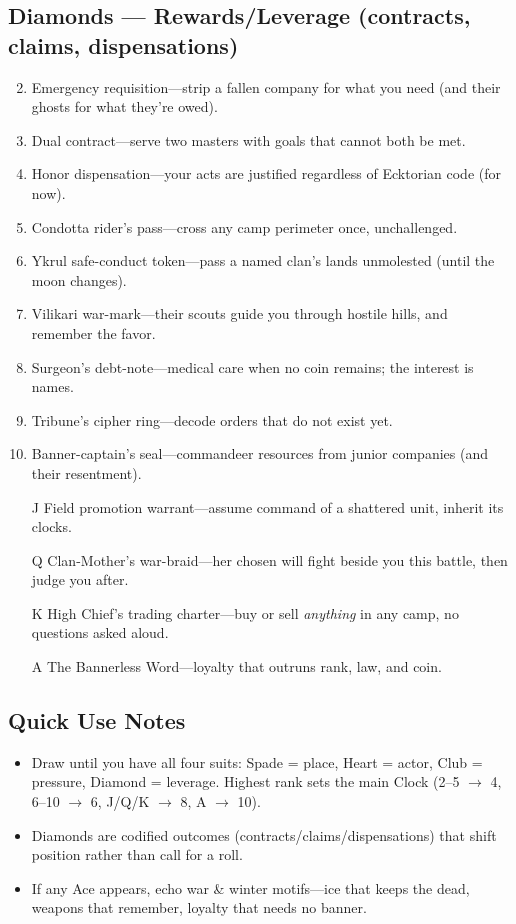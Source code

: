 \subsection*{Diamonds --- Rewards/Leverage (contracts, claims, dispensations)}
\label{sec:black-banners-rewards}
\begin{enumerate}
\setcounter{enumi}{1}
\item Emergency requisition—strip a fallen company for what you need (and their ghosts for what they’re owed).
\item Dual contract—serve two masters with goals that cannot both be met.
\item Honor dispensation—your acts are justified regardless of Ecktorian code (for now).
\item Condotta rider’s pass—cross any camp perimeter once, unchallenged.
\item Ykrul safe-conduct token—pass a named clan’s lands unmolested (until the moon changes).
\item Vilikari war-mark—their scouts guide you through hostile hills, and remember the favor.
\item Surgeon’s debt-note—medical care when no coin remains; the interest is names.
\item Tribune’s cipher ring—decode orders that do not exist yet.
\item Banner-captain’s seal—commandeer resources from junior companies (and their resentment).
\item[J] Field promotion warrant—assume command of a shattered unit, inherit its clocks.
\item[Q] Clan-Mother’s war-braid—her chosen will fight beside you this battle, then judge you after.
\item[K] High Chief’s trading charter—buy or sell \emph{anything} in any camp, no questions asked aloud.
\item[A] The Bannerless Word—loyalty that outruns rank, law, and coin.
\end{enumerate}

\subsection*{Quick Use Notes}
\label{sec:black-banners-quick-use}
\begin{itemize}
\item Draw until you have all four suits: Spade = place, Heart = actor, Club = pressure, Diamond = leverage. Highest rank sets the main Clock (2--5 $\rightarrow$ 4, 6--10 $\rightarrow$ 6, J/Q/K $\rightarrow$ 8, A $\rightarrow$ 10).
\item Diamonds are codified outcomes (contracts/claims/dispensations) that shift position rather than call for a roll.
\item If any Ace appears, echo war \& winter motifs—ice that keeps the dead, weapons that remember, loyalty that needs no banner.
\end{itemize}

